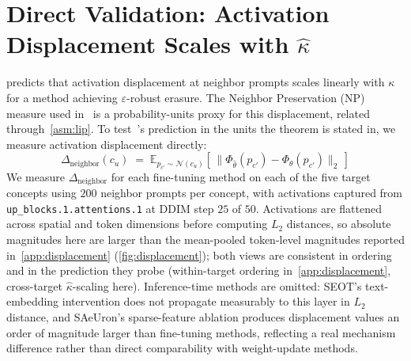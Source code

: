 \section{Direct Validation: Activation Displacement Scales with $\hat\kappa$}
\label{app:displacement_kappa}
 predicts that activation displacement at neighbor prompts scales linearly with $\kappa$ for a method achieving $\varepsilon$-robust erasure. The Neighbor Preservation (NP) measure used in~ is a probability-units proxy for this displacement, related through~\cref{asm:lip}. To test~'s prediction in the units the theorem is stated in, we measure activation displacement directly:
\[
\Delta_{\text{neighbor}}(c_u) \;=\; \mathbb{E}_{p_{c'} \sim \mathcal{N}(c_u)}\!\left[\, \big\| \Phi_{\hat\theta}(p_{c'}) - \Phi_\theta(p_{c'}) \big\|_2 \,\right]
\]
We measure $\Delta_{\text{neighbor}}$ for each fine-tuning method on each of the five target concepts using $200$ neighbor prompts per concept, with activations captured from \texttt{up\_blocks.1.attentions.1} at DDIM step $25$ of $50$. Activations are flattened across spatial and token dimensions before computing $L_2$ distances, so absolute magnitudes here are larger than the mean-pooled token-level magnitudes reported in~\cref{app:displacement} (\cref{fig:displacement}); both views are consistent in ordering and in the prediction they probe (within-target ordering in~\cref{app:displacement}, cross-target $\hat\kappa$-scaling here). Inference-time methods are omitted: SEOT's text-embedding intervention does not propagate measurably to this layer in $L_2$ distance, and SAeUron's sparse-feature ablation produces displacement values an order of magnitude larger than fine-tuning methods, reflecting a real mechanism difference rather than direct comparability with weight-update methods.

